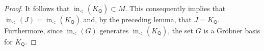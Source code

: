 \documentclass[ALCO,published]{cedram}
\numberwithin{equation}{section}
\renewcommand{\L}{\mathcal{L}}%
\DeclareMathOperator{\In}{\mathrm{in}}
\newcommand{\1}{^{-1}}
\def\ZZ{\mathbb{Z}}
\def\Q{\mathsf{Q}}
\begin{document}
\begin{proof}
It follows that $\In_<(K_\Q)\subset M$.  This consequently implies that $\In_<(J)=\In_<(K_\Q)$ and, by the preceding lemma, that $J=K_\Q$.  Furthermore, since $\In_<(G)$ generates $\In_<(K_\Q)$, the set $G$ is a Gr\"obner basis for $K_\Q$.
%
%
%

\end{proof}
\end{document}
